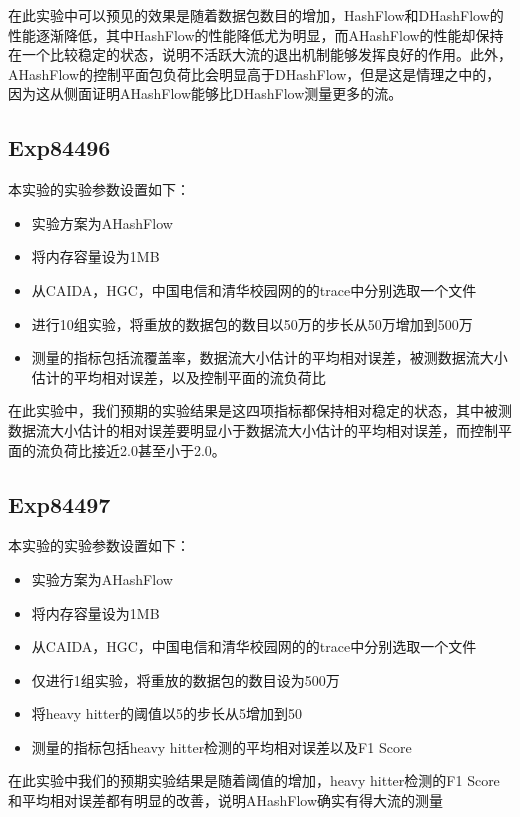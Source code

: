 \documentclass{article}
\begin{document}
在此实验中可以预见的效果是随着数据包数目的增加，HashFlow和DHashFlow的性能逐渐降低，其中HashFlow的性能降低尤为明显，而AHashFlow的性能却保持在一个比较稳定的状态，说明不活跃大流的退出机制能够发挥良好的作用。此外，AHashFlow的控制平面包负荷比会明显高于DHashFlow，但是这是情理之中的，因为这从侧面证明AHashFlow能够比DHashFlow测量更多的流。

\subsection{Exp84496}
本实验的实验参数设置如下：
\begin{itemize}
\item 实验方案为AHashFlow
\item 将内存容量设为1MB
\item 从CAIDA，HGC，中国电信和清华校园网的的trace中分别选取一个文件
\item 进行10组实验，将重放的数据包的数目以50万的步长从50万增加到500万
\item 测量的指标包括流覆盖率，数据流大小估计的平均相对误差，被测数据流大小估计的平均相对误差，以及控制平面的流负荷比
\end{itemize}

在此实验中，我们预期的实验结果是这四项指标都保持相对稳定的状态，其中被测数据流大小估计的相对误差要明显小于数据流大小估计的平均相对误差，而控制平面的流负荷比接近2.0甚至小于2.0。

\subsection{Exp84497}
本实验的实验参数设置如下：
\begin{itemize}
\item 实验方案为AHashFlow
\item 将内存容量设为1MB
\item 从CAIDA，HGC，中国电信和清华校园网的的trace中分别选取一个文件
\item 仅进行1组实验，将重放的数据包的数目设为500万
\item 将heavy hitter的阈值以5的步长从5增加到50
\item 测量的指标包括heavy hitter检测的平均相对误差以及F1 Score
\end{itemize}

在此实验中我们的预期实验结果是随着阈值的增加，heavy hitter检测的F1 Score和平均相对误差都有明显的改善，说明AHashFlow确实有得大流的测量
\end{document}

